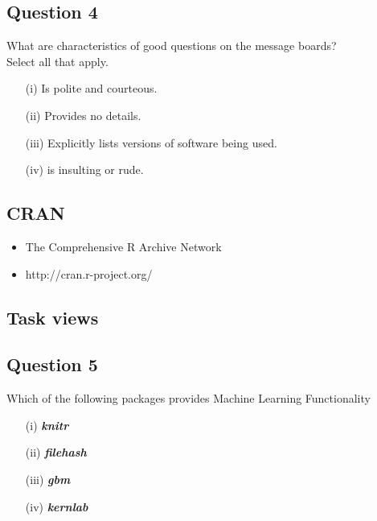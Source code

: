 \documentclass[12pt]{article}
\begin{document}
\subsection*{Question 4}

 
What are characteristics of good questions on the message boards? \\ Select all that apply.
 

\begin{itemize}

\item[(i)] Is polite and courteous. 

\item[(ii)] Provides no details. 

\item[(iii)] Explicitly lists versions of software being used. 

\item[(iv)] is insulting or rude. 
\end{itemize}


\newpage
\subsection*{CRAN}
\begin{itemize}
\item The Comprehensive R Archive Network
\item http://cran.r-project.org/
\end{itemize}
\subsection*{Task views}


\newpage
\subsection*{Question 5}

Which of the following packages provides Machine Learning Functionality
\begin{itemize}
\item[(i)] \textbf{\textit{knitr}}
\item[(ii)] \textbf{\textit{filehash}}
\item[(iii)] \textbf{\textit{gbm}}
\item[(iv)] \textbf{\textit{kernlab}}
\end{itemize}
\end{document}
